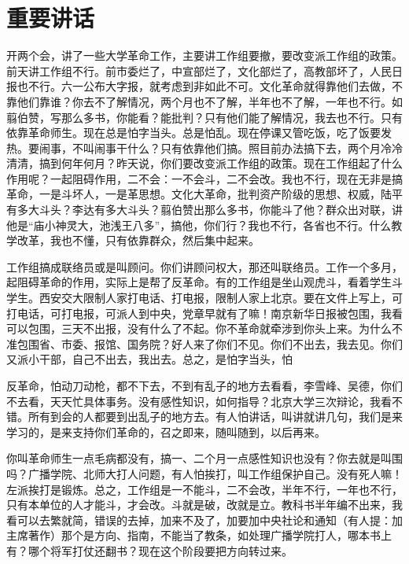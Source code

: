 \section[重要讲话（一九六六年七月二十一日）]{重要讲话}


开两个会，讲了一些大学革命工作，主要讲工作组要撤，要改变派工作组的政策。前天讲工作组不行。前市委烂了，中宣部烂了，文化部烂了，高教部坏了，人民日报也不行。六一公布大字报，就考虑到非如此不可。文化革命就得靠他们去做，不靠他们靠谁？你去不了解情况，两个月也不了解，半年也不了解，一年也不行。如翦伯赞，写那么多书，你能看？能批判？只有他们能了解情况，我去也不行。只有依靠革命师生。现在总是怕字当头。总是怕乱。现在停课又管吃饭，吃了饭要发热。要闹事，不叫闹事干什么？只有依靠他们搞。照目前办法搞下去，两个月冷冷清清，搞到何年何月？昨天说，你们要改变派工作组的政策。现在工作组起了什么作用呢？一起阻碍作用，二不会：一不会斗，二不会改。我也不行，现在无非是搞革命，一是斗坏人，一是革思想。文化大革命，批判资产阶级的思想、权威，陆平有多大斗头？李达有多大斗头？翦伯赞出那么多书，你能斗了他？群众出对联，讲他是“庙小神灵大，池浅王八多”，搞他，你们行？我也不行，各省也不行。什么教学改革，我也不懂，只有依靠群众，然后集中起来。

工作组搞成联络员或是叫顾问。你们讲顾问权大，那还叫联络员。工作一个多月，起阻碍革命的作用，实际上是帮了反革命。有的工作组是坐山观虎斗，看着学生斗学生。西安交大限制人家打电话、打电报，限制人家上北京。要在文件上写上，可打电话，可打电报，可派人到中央，党章早就有了嘛！南京新华日报被包围，我看可以包围，三天不出报，没有什么了不起。你不革命就牵涉到你头上来。为什么不准包围省、市委、报馆、国务院？好人来了你们不见。你们不出去，我去见。你们又派小干部，自己不出去，我出去。总之，是怕字当头，怕

反革命，怕动刀动枪，都不下去，不到有乱子的地方去看看，李雪峰、吴德，你们不去看，天天忙具体事务。没有感性知识，如何指导？北京大学三次辩论，我看不错。所有到会的人都要到出乱子的地方去。有人怕讲话，叫讲就讲几句，我们是来学习的，是来支持你们革命的，召之即来，随叫随到，以后再来。

你叫革命师生一点毛病都没有，搞一、二个月一点感性知识也没有？你去就是叫围吗？广播学院、北师大打人问题，有人怕挨打，叫工作组保护自己。没有死人嘛！左派挨打是锻炼。总之，工作组是一不能斗，二不会改，半年不行，一年也不行，只有本单位的人才能斗，才会改。斗就是破，改就是立。教科书半年编不出来，我看可以去繁就简，错误的去掉，加来不及了，加要加中央社论和通知（有人提：加主席著作）那个是方向、指南，不能当了教条，如处理广播学院打人，哪本书上有？哪个将军打仗还翻书？现在这个阶段要把方向转过来。

